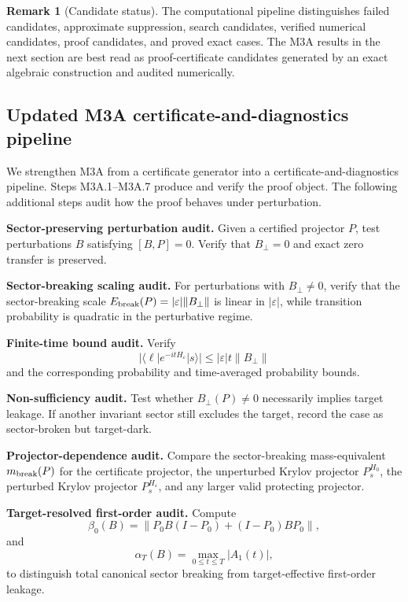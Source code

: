 \documentclass[11pt]{article}
\theoremstyle{definition}
\newtheorem{remark}[theorem]{Remark}
\begin{document}
\begin{remark}[Candidate status]
The computational pipeline distinguishes failed candidates, approximate suppression, search candidates, verified numerical candidates, proof candidates, and proved exact cases. The M3A results in the next section are best read as proof-certificate candidates generated by an exact algebraic construction and audited numerically.
\end{remark}

\subsection{Updated M3A certificate-and-diagnostics pipeline}
We strengthen M3A from a certificate generator into a certificate-and-diagnostics pipeline. Steps M3A.1--M3A.7 produce and verify the proof object. The following additional steps audit how the proof behaves under perturbation.

\begin{description}[leftmargin=3.8em,style=nextline]
\item[M3A.8] \textbf{Sector-preserving perturbation audit.} Given a certified projector $P$, test perturbations $B$ satisfying $[B,P]=0$. Verify that $B_\perp=0$ and exact zero transfer is preserved.
\item[M3A.9] \textbf{Sector-breaking scaling audit.} For perturbations with $B_\perp\ne0$, verify that the sector-breaking scale $E_{\rm break}(P)=|\varepsilon|\|B_\perp\|$ is linear in $|\varepsilon|$, while transition probability is quadratic in the perturbative regime.
\item[M3A.10] \textbf{Finite-time bound audit.} Verify
\[
|\langle \ell|e^{-itH_\varepsilon}|s\rangle|\le |\varepsilon|t\|B_\perp\|
\]
and the corresponding probability and time-averaged probability bounds.
\item[M3A.11] \textbf{Non-sufficiency audit.} Test whether $B_\perp(P)\ne0$ necessarily implies target leakage. If another invariant sector still excludes the target, record the case as sector-broken but target-dark.
\item[M3A.12] \textbf{Projector-dependence audit.} Compare the sector-breaking mass-equivalent $m_{\rm break}(P)$ for the certificate projector, the unperturbed Krylov projector $P_s^{H_0}$, the perturbed Krylov projector $P_s^{H_\varepsilon}$, and any larger valid protecting projector.
\item[M3A.13] \textbf{Target-resolved first-order audit.} Compute
\[
\beta_0(B)=\|P_0B(I-P_0)+(I-P_0)BP_0\|,
\]
and
\[
\alpha_T(B)=\max_{0\le t\le T}|A_1(t)|,
\]
to distinguish total canonical sector breaking from target-effective first-order leakage.
\end{description}
\end{document}
